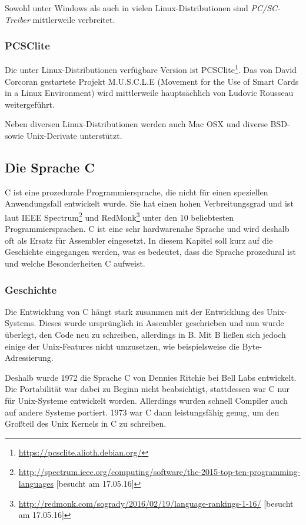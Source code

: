 Sowohl unter Windows als auch in vielen Linux-Distributionen sind
\textit{PC/SC-Treiber} mittlerweile verbreitet.

\subsubsection[PCSClite (Schenkel)]{PCSClite}
Die unter Linux-Distributionen verfügbare Version ist
PCSClite\footnote{\url{https://pcsclite.alioth.debian.org/}}.
Das von David Corcoran gestartete Projekt M.U.S.C.L.E
(Movement for the Use of Smart Cards in a Linux Environment)
wird mittlerweile hauptsächlich von Ludovic Rousseau
weitergeführt\cite{pcscliteweb}.

Neben diversen Linux-Distributionen werden auch Mac OSX und diverse
BSD- sowie Unix-Derivate unterstützt.

\subsection[Die Sprache C (Heumann)]{Die Sprache C}
 C ist eine prozedurale Programmiersprache, die nicht für einen speziellen
 Anwendungsfall entwickelt wurde. Sie hat einen hohen Verbreitungsgrad
 und ist laut \ac{IEEE} Spectrum\footnote{\url{http://spectrum.ieee.org/computing/software/the-2015-top-ten-programming-languages} [besucht am 17.05.16]}
 und RedMonk\footnote{\url{http://redmonk.com/sogrady/2016/02/19/language-rankings-1-16/} [besucht am 17.05.16]}
 unter den 10 beliebtesten Programmiersprachen. C ist eine sehr hardwarenahe
 Sprache und wird deshalb oft als Ersatz für Assembler eingesetzt. In
 diesem Kapitel soll kurz auf die Geschichte eingegangen werden, was es
 bedeutet, dass die Sprache prozedural ist und welche Besonderheiten C
 aufweist.

 \subsubsection[Geschichte (Heumann)]{Geschichte}
  Die Entwicklung von C hängt stark zusammen mit der Entwicklung des Unix-Systems.
  Dieses wurde ursprünglich in Assembler geschrieben und nun wurde
  überlegt, den Code neu zu schreiben, allerdings in B. Mit B ließen sich jedoch
  einige der Unix-Features nicht umzusetzen, wie beispielsweise die Byte-Adressierung.
  
  Deshalb wurde 1972 die Sprache C von Dennies Ritchie bei Bell Labs entwickelt. Die Portabilität war
  dabei zu Beginn nicht beabsichtigt, stattdessen war C nur für Unix-Systeme entwickelt
  worden. Allerdings wurden schnell Compiler auch auf andere Systeme portiert. 1973
  war C dann leistungsfähig genug, um den Großteil des Unix Kernels in C zu schreiben.
  
